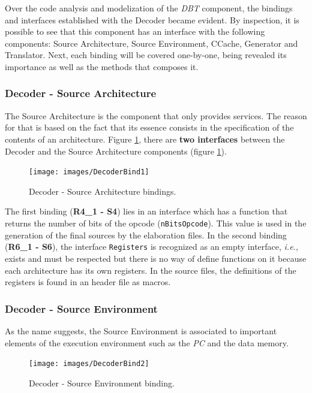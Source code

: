 
Over the code analysis and modelization of the \textit{DBT} component, the bindings and interfaces established with the Decoder became evident. By inspection, it is possible to see that this component has an interface with the following components: Source Architecture, Source Environment, CCache, Generator and Translator. Next, each binding will be covered one-by-one, being revealed its importance as well as the methods that composes it.

\subsubsection*{Decoder - Source Architecture}
    The Source Architecture is the component that only provides services. The reason for that is based on the fact that its essence consists in the specification of the contents of an architecture. Figure \ref{fig:DecoderBind1}, there are \textbf{two interfaces} between the Decoder and the Source Architecture components (figure \ref{fig:DecoderBind1}).
    
    \begin{figure}[!htb]
    \centerline{
    \texttt{[image: images/DecoderBind1]}
    }
    \caption{Decoder - Source Architecture bindings.}
    \label{fig:DecoderBind1} 
    \end{figure}
    
    The first binding (\textbf{R4\_1 - S4}) lies in an interface which has a function that returns the number of bits of the opcode (\texttt{nBitsOpcode}). This value is used in the generation of the final sources by the elaboration files. In the second binding (\textbf{R6\_1 - S6}), the interface \texttt{Registers} is recognized as an empty interface, \textit{i.e.}, exists and must be respected but there is no way of define functions on it because each architecture has its own registers. In the source files, the definitions of the registers is found in an header file as macros.


\subsubsection*{Decoder - Source Environment}
    As the name suggests, the Source Environment is associated to important elements of the execution environment such as the \textit{PC} and the data memory. 
    
    \begin{figure}[!htb]
    \centerline{
    \texttt{[image: images/DecoderBind2]}
    }
    \caption{Decoder - Source Environment binding.}
    \label{fig:DecoderBind2} 
    \end{figure}
    
